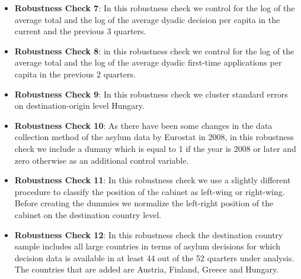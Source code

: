 \documentclass[11pt,a4paper]{scrartcl}
\begin{document}
\begin{itemize}
	\item \textbf{Robustness Check 7}: In this robustness check we control for the log of the average total and the log of the average dyadic decision per capita in the current and the previous 3 quarters.
	
	\item \textbf{Robustness Check 8}: in this robustness check we control for the log of the average total and the log of the average dyadic first-time applications per capita in the previous 2 quarters.
	
	\item \textbf{Robustness Check 9}: In this robustness check we cluster standard errors on destination-origin level Hungary.  
	
	\item \textbf{Robustness Check 10}: As there have been some changes in the data collection method of the asylum data by Eurostat in 2008, in this robustness check we include a dummy which is equal to 1 if the year is 2008 or later and zero otherwise as an additional control variable. 

	\item \textbf{Robustness Check 11}: In this robustness check we use a slightly different procedure to classify the position of the cabinet as left-wing or right-wing. Before creating the dummies we normalize the left-right position of the cabinet on the destination country level.

	\item \textbf{Robustness Check 12}: In this robustness check the destination country sample includes all large countries in terms of asylum decisions for which decision data is available in at least 44 out of the 52 quarters under analysis. The countries that are added are Austria, Finland, Greece and Hungary. 
	 
\end{itemize}	
	

\clearpage
\FloatBarrier

\end{document}

